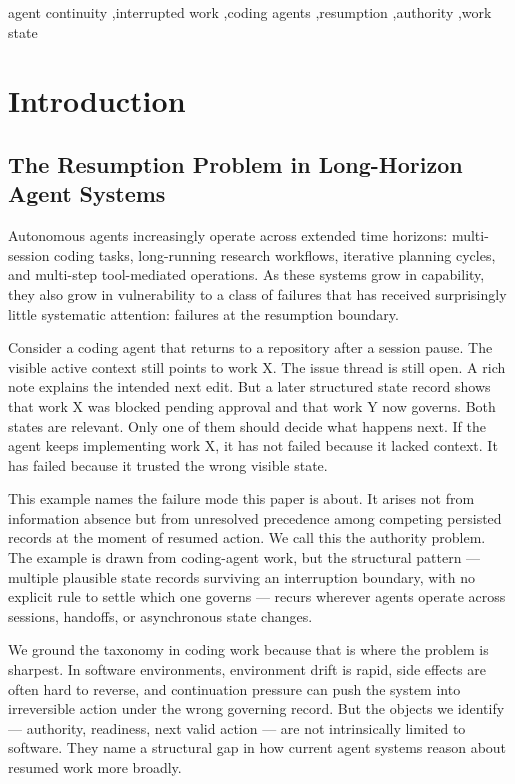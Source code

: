 \documentclass[a4paper,fleqn]{cas-dc}
\begin{document}
\begin{keywords}
agent continuity \sep interrupted work \sep coding agents \sep resumption \sep authority \sep work state
\end{keywords}

\maketitle

\section{Introduction}

\subsection{The Resumption Problem in Long-Horizon Agent Systems}

Autonomous agents increasingly operate across extended time horizons: multi-session coding tasks, long-running research workflows, iterative planning cycles, and multi-step tool-mediated operations. As these systems grow in capability, they also grow in vulnerability to a class of failures that has received surprisingly little systematic attention: failures at the resumption boundary.

Consider a coding agent that returns to a repository after a session pause. The visible active context still points to work X. The issue thread is still open. A rich note explains the intended next edit. But a later structured state record shows that work X was blocked pending approval and that work Y now governs. Both states are relevant. Only one of them should decide what happens next. If the agent keeps implementing work X, it has not failed because it lacked context. It has failed because it trusted the wrong visible state.

This example names the failure mode this paper is about. It arises not from information absence but from unresolved precedence among competing persisted records at the moment of resumed action. We call this the authority problem. The example is drawn from coding-agent work, but the structural pattern --- multiple plausible state records surviving an interruption boundary, with no explicit rule to settle which one governs --- recurs wherever agents operate across sessions, handoffs, or asynchronous state changes.

We ground the taxonomy in coding work because that is where the problem is sharpest. In software environments, environment drift is rapid, side effects are often hard to reverse, and continuation pressure can push the system into irreversible action under the wrong governing record. But the objects we identify --- authority, readiness, next valid action --- are not intrinsically limited to software. They name a structural gap in how current agent systems reason about resumed work more broadly.
\end{document}
